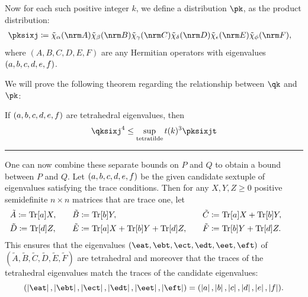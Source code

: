 \documentclass[notitlepage, 10pt]{article}
\begin{document}
{    Now for each such positive integer $k$, we define a distribution $\pk$, as the product distribution:
    \begin{align}
        \pksixj
        &\coloneqq \tilde \chi_\ya(\nrm A)\tilde \chi_\yb(\nrm B)\tilde \chi_\yc(\nrm C)\tilde \chi_\yd(\nrm D)\tilde \chi_\ye(\nrm E)\tilde \chi_\yf(\nrm F),
    \end{align}
    where $(A,B,C,D,E,F)$ are any Hermitian operators with eigenvalues $(a,b,c,d,e,f)$.

    We will prove the following theorem regarding the relationship between $\qk$ and $\pk$:
    \begin{thm}
        If $(a, b, c, d, e, f)$ are tetrahedral eigenvalues, then
        \begin{equation}
            \qksixj^4 \leq \sup_{\mathrm{tetra tilde}} t(k)^3 \pksixjt
        \end{equation}
    \end{thm}
\hrule
    One can now combine these separate bounds on $P$ and $Q$ to obtain a bound between $P$ and $Q$.
    Let $(a,b,c,d,e,f)$ be the given candidate sextuple of eigenvalues satisfying the trace conditions.
    Then for any $X,Y,Z \geq 0$ positive semidefinite $n\times n$ matrices that are trace one, let
    \begin{equation}
        \begin{alignedat}{3}
            &\tilde A \coloneqq {\operatorname{Tr}[a]}X, \qquad
            &&\tilde B \coloneqq {\operatorname{Tr}[b]}Y, \qquad
            &&\tilde C \coloneqq {\operatorname{Tr}[a]}X+{\operatorname{Tr}[b]}Y, \qquad \\
            &\tilde D \coloneqq {\operatorname{Tr}[d]}Z, \qquad
            &&\tilde E \coloneqq {\operatorname{Tr}[a]}X+{\operatorname{Tr}[b]}Y+{\operatorname{Tr}[d]}Z, \qquad
            &&\tilde F \coloneqq {\operatorname{Tr}[b]}Y + {\operatorname{Tr}[d]}Z.
        \end{alignedat}
    \end{equation}
    This ensures that the eigenvalues $(\eat,\ebt,\ect,\edt,\eet,\eft)$ of $(\tilde A, \tilde B, \tilde C, \tilde D, \tilde E, \tilde F)$ are tetrahedral and moreover that the traces of the tetrahedral eigenvalues match the traces of the candidate eigenvalues:
    \begin{equation}
        (\abs \eat,\abs \ebt,\abs \ect,\abs \edt,\abs \eet,\abs \eft) = (\abs \ea, \abs \eb, \abs \ec, \abs \ed, \abs \ee, \abs \ef).

\end{equation}}
\end{document}
